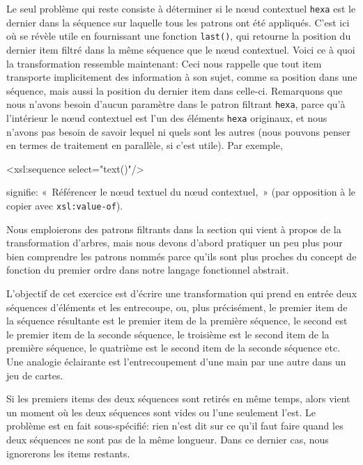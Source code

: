 Le seul problème qui reste consiste à déterminer si le nœud
contextuel \texttt{hexa} est le dernier dans la séquence sur laquelle
tous les patrons ont été appliqués. C'est ici où \XPath se révèle
utile en fournissant une fonction \texttt{last()}, qui retourne la
position du dernier item filtré dans la même séquence que le nœud
contextuel. Voici ce à quoi la transformation ressemble maintenant:
\noindent Ceci nous rappelle que tout item transporte implicitement
des information à son sujet, comme sa position dans une séquence, mais
aussi la position du dernier item dans celle-ci. Remarquons que nous
n'avons besoin d'aucun paramètre dans le patron filtrant
\texttt{hexa}, parce qu'à l'intérieur le nœud contextuel est l'un
des éléments \texttt{hexa} originaux, et nous n'avons pas besoin de
savoir lequel ni quels sont les autres (nous pouvons penser en termes
de traitement en parallèle, si c'est utile). Par exemple,
\begin{sverb}
<xsl:sequence select="text()"/>
\end{sverb}
signifie: «~Référencer le nœud textuel du nœud contextuel,~»
(par opposition à le copier avec \texttt{xsl:value-of}).

Nous emploierons des patrons filtrants dans la section qui vient à
propos de la transformation d'arbres, mais nous devons d'abord
pratiquer un peu plus pour bien comprendre les patrons nommés parce
qu'ils sont plus proches du concept de fonction du premier ordre dans
notre langage fonctionnel abstrait.


L'objectif de cet exercice est d'écrire une transformation \XSLT qui
prend en entrée deux séquences d'éléments et les entrecoupe, ou, plus
précisément, le premier item de la séquence résultante est le premier
item de la première séquence, le second est le premier item de la
seconde séquence, le troisième est le second item de la première
séquence, le quatrième est le second item de la seconde séquence etc.
Une analogie éclairante est l'entrecoupement d'une main par une autre
dans un jeu de cartes.

Si les premiers items des deux séquences sont retirés en même temps,
alors vient un moment où les deux séquences sont vides ou l'une
seulement l'est. Le problème est en fait sous-spécifié: rien n'est dit
sur ce qu'il faut faire quand les deux séquences ne sont pas de la
même longueur. Dans ce dernier cas, nous ignorerons les items
restants.


